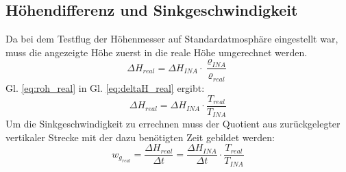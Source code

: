 \subsection{Höhendifferenz und Sinkgeschwindigkeit}
Da bei dem Testflug der Höhenmesser auf Standardatmosphäre eingestellt war, muss die angezeigte Höhe zuerst in die reale Höhe umgerechnet werden.
\begin{equation} \label{eq:deltaH_real}
\Delta H_{real} = \Delta H_{INA}  \cdot  \frac{\varrho_{INA}}{\varrho_{real}}
\end{equation}
Gl. \ref{eq:roh_real} in Gl. \ref{eq:deltaH_real} ergibt:
\begin{equation}
\Delta H_{real} = \Delta H_{INA}  \cdot  \frac{T_{real}}{T_{INA}}
\end{equation}
Um die Sinkgeschwindigkeit zu errechnen muss der Quotient aus zurückgelegter vertikaler Strecke mit der dazu benötigten Zeit gebildet werden:
\begin{equation}\label{eq:wg_real}
w_{g_{real}}=\frac{\Delta H_{real}}{\Delta t} = \frac{\Delta H_{INA}}{\Delta t}  \cdot  \frac{T_{real}}{T_{INA}}
\end{equation}


\newpage